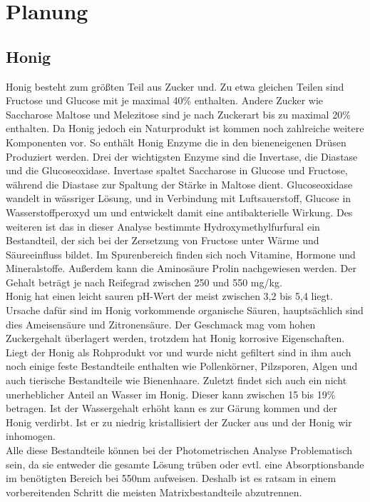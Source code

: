 \chapter{Planung}

\label{chap:Planung}

\section{Honig}
Honig besteht zum größten Teil aus Zucker und. Zu etwa gleichen Teilen sind Fructose und Glucose mit je maximal 40\% enthalten. Andere Zucker wie Saccharose Maltose und Melezitose sind je nach Zuckerart bis zu maximal 20\% enthalten. Da Honig jedoch ein Naturprodukt ist kommen noch zahlreiche weitere Komponenten vor. So enthält Honig Enzyme die in den bieneneigenen Drüsen Produziert werden. Drei der wichtigsten Enzyme sind die Invertase, die Diastase und die Glucoseoxidase. Invertase spaltet Saccharose in Glucose und Fructose, während die Diastase zur Spaltung der Stärke in Maltose dient. Glucoseoxidase wandelt in wässriger Lösung, und in Verbindung mit Luftsauerstoff, Glucose in Wasserstoffperoxyd um und entwickelt damit eine antibakterielle Wirkung. Des weiteren ist das in dieser Analyse bestimmte Hydroxymethylfurfural ein Bestandteil, der sich bei der Zersetzung von Fructose unter Wärme und Säureeinfluss bildet. Im Spurenbereich finden sich noch Vitamine, Hormone und Mineralstoffe. Außerdem kann die Aminosäure Prolin nachgewiesen werden. Der Gehalt beträgt je nach Reifegrad zwischen 250 und 550 mg/kg.\\
Honig hat einen leicht sauren pH-Wert der meist zwischen 3,2 bis 5,4 liegt. Ursache dafür sind im Honig vorkommende organische Säuren, hauptsächlich sind dies Ameisensäure und Zitronensäure. Der Geschmack mag vom hohen Zuckergehalt überlagert werden, trotzdem hat Honig korrosive Eigenschaften.\\
Liegt der Honig als Rohprodukt vor und wurde nicht gefiltert sind in ihm auch noch einige feste Bestandteile enthalten wie Pollenkörner, Pilzsporen, Algen und auch tierische Bestandteile wie Bienenhaare. Zuletzt findet sich auch ein nicht unerheblicher Anteil an Wasser im Honig. Dieser kann zwischen 15 bis 19\% betragen. Ist der Wassergehalt erhöht kann es zur Gärung kommen und der Honig verdirbt. Ist er zu niedrig kristallisiert der Zucker aus und der Honig wir inhomogen.\\
Alle diese Bestandteile können bei der Photometrischen Analyse Problematisch sein, da sie entweder die gesamte Lösung trüben oder evtl. eine Absorptionsbande im benötigten Bereich bei 550nm aufweisen. Deshalb ist es ratsam in einem vorbereitenden Schritt die meisten Matrixbestandteile abzutrennen. 

